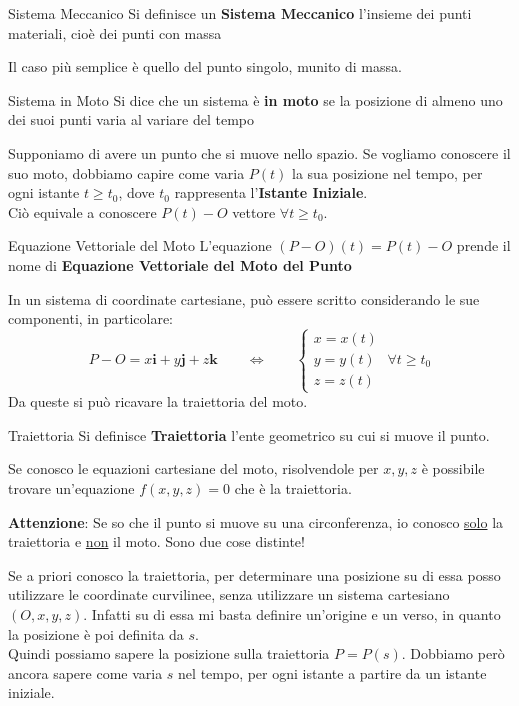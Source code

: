 \documentclass[11pt,a4paper,twoside]{article}
\theoremstyle{definition}
\begin{document}
\begin{defn}{Sistema Meccanico}{}
	Si definisce un \textbf{Sistema Meccanico} l'insieme dei punti materiali, cioè dei punti con massa
\end{defn}

Il caso più semplice è quello del punto singolo, munito di massa.

\begin{defn}{Sistema in Moto}{}
	Si dice che un sistema è \textbf{in moto} se la posizione di almeno uno dei suoi punti varia al variare del tempo
\end{defn}

Supponiamo di avere un punto che si muove nello spazio. Se vogliamo conoscere il suo moto, dobbiamo capire come varia $P(t)$ la sua posizione nel tempo, per ogni istante $t \geq t_0$, dove $t_0$ rappresenta l'\textbf{Istante Iniziale}.\\
Ciò equivale a conoscere $P(t)-O$ vettore $\forall t \geq t_0$.

\begin{defn}{Equazione Vettoriale del Moto}{}
	L'equazione $(P-O)(t) = P(t)-O$ prende il nome di \textbf{Equazione Vettoriale del Moto del Punto}
\end{defn}

In un sistema di coordinate cartesiane, può essere scritto considerando le sue componenti, in particolare:
\[ P-O = x \mathbf i + y\mathbf j + z \mathbf k \qquad \Leftrightarrow \qquad \begin{cases} x = x(t)\\ y = y(t)\\ z = z(t) \end{cases}\; \forall t \geq t_0 \]
Da queste si può ricavare la traiettoria del moto.

\begin{defn}{Traiettoria}{}
	Si definisce \textbf{Traiettoria} l'ente geometrico su cui si muove il punto.
\end{defn}

Se conosco le equazioni cartesiane del moto, risolvendole per $x, y, z$ è possibile trovare un'equazione $f(x, y, z) = 0$ che è la traiettoria.

\textbf{Attenzione}: Se so che il punto si muove su una circonferenza, io conosco \underline{solo} la traiettoria e \underline{non} il moto. Sono due cose distinte!

Se a priori conosco la traiettoria, per determinare una posizione su di essa posso utilizzare le coordinate curvilinee, senza utilizzare un sistema cartesiano $(O, x, y, z)$. Infatti su di essa mi basta definire un'origine e un verso, in quanto la posizione è poi definita da $s$.\\
Quindi possiamo sapere la posizione sulla traiettoria $P = P(s)$. Dobbiamo però ancora sapere come varia $s$ nel tempo, per ogni istante a partire da un istante iniziale.
\end{document}
